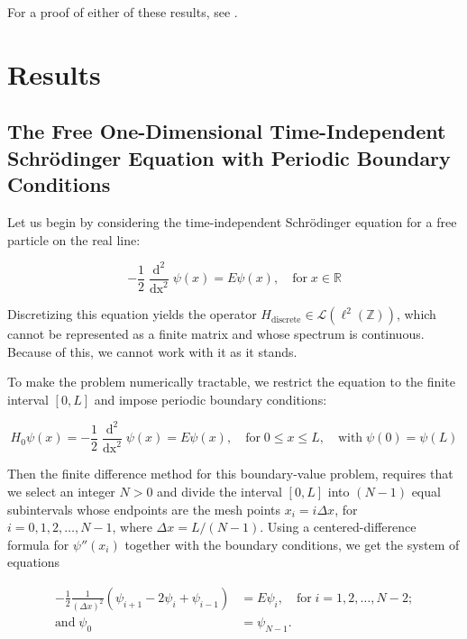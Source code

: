 \documentclass[11pt]{article}
\DeclareMathOperator{\diff}{d}
\DeclareMathOperator{\diffx}{dx}
\begin{document}
For a proof of either of these results, see \cite{paulhege2025}.

\newpage

\section{Results}

\subsection{The Free One-Dimensional Time-Independent Schrödinger Equation with Periodic Boundary Conditions}

Let us begin by considering the time-independent Schrödinger equation for a free particle on the real line:

\begin{equation*}
    -\frac{1}{2}\frac{\diff^2}{\diffx^2}\psi(x) = E \psi(x), \quad \text{for} \; x \in \mathbb{R}
\end{equation*}

Discretizing this equation yields the operator $H_{\text{discrete}} \in \mathcal{L} (\ell^2(\mathbb{Z}))$, which cannot be represented as a finite matrix and whose spectrum is continuous. Because of this, we cannot work with it as it stands.

To make the problem numerically tractable, we restrict the equation to the finite interval $[0, L]$ and impose periodic boundary conditions:

\begin{equation*}
    H_0 \psi(x) = -\frac{1}{2}\frac{\diff^2}{\diffx^2}\psi(x) = E \psi(x), \quad \text{for} \; 0 \leq x \leq L, \quad \text{with} \; \psi(0) = \psi(L)
\end{equation*}

Then the finite difference method for this boundary-value problem, requires that we select an integer $N > 0$ and divide the interval $[0, L]$ into $(N - 1)$ equal subintervals whose endpoints are the mesh points $x_i = i \Delta x$, for $i = 0, 1, 2, \dots, N - 1$, where $\Delta x = L / (N - 1)$. Using a centered-difference formula for $\psi''(x_i)$ together with the boundary conditions, we get the system of equations

\begin{align*}
    -\frac{1}{2} \frac{1}{(\Delta x)^2} \left( \psi_{i+1} - 2\psi_i + \psi_{i-1} \right) &= E \psi_i, \quad \text{for} \; i = 1, 2, \dots, N - 2; \\
    \text{and} \; \psi_0 &= \psi_{N-1}.
\end{align*}
\end{document}
